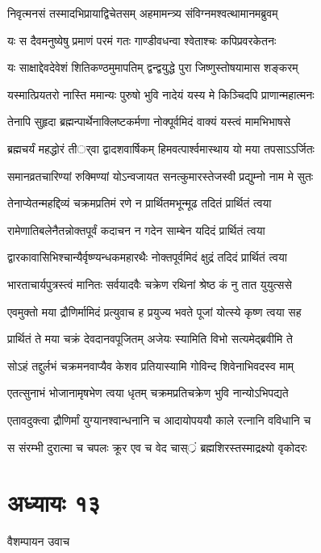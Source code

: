 \twolineshloka
{निवृत्मनसं तस्मादभिप्रायाद्विचेतसम्}
{अहमामन्त्र्य संविग्नमश्वत्थामानमब्रुवम्}


\twolineshloka
{यः स दैवमनुष्येषु प्रमाणं परमं गतः}
{गाण्डीवधन्वा श्वेताश्चः कपिप्रवरकेतनः}


\twolineshloka
{यः साक्षाद्देवदेवेशं शितिकण्ठमुमापतिम्}
{द्वन्द्वयुद्धे पुरा जिष्णुस्तोषयामास शङ्करम्}


\twolineshloka
{यस्मात्प्रियतरो नास्ति ममान्यः पुरुषो भुवि}
{नादेयं यस्य मे किञ्चिदपि प्राणान्महात्मनः}


\twolineshloka
{तेनापि सुहृदा ब्रह्मन्पार्थेनाक्लिष्टकर्मणा}
{नोक्पूर्वमिदं वाक्यं यस्त्वं मामभिभाषसे}


\twolineshloka
{ब्रह्मचर्यं महद्धोरं तीर््वा द्वादशवार्षिकम्}
{हिमवत्पार्श्वमास्थाय यो मया तपसाऽऽर्जितः}


\twolineshloka
{समानव्रतचारिण्यां रुक्मिण्यां योऽन्वजायत}
{सनत्कुमारस्तेजस्वी प्रद्युम्नो नाम मे सुतः}


\twolineshloka
{तेनाप्येतन्महद्दिव्यं चक्रमप्रतिमं रणे}
{न प्रार्थितमभून्मूढ तदितं प्रार्थितं त्वया}


\twolineshloka
{रामेणातिबलेनैतन्नोक्तपूर्वं कदाचन}
{न गदेन साम्बेन यदिदं प्रार्थितं त्वया}


\twolineshloka
{द्वारकावासिभिश्चान्यैर्वृष्ण्यन्धकमहारथैः}
{नोक्तपूर्वमिदं क्षुद्रं तदिदं प्रार्थितं त्वया}


\twolineshloka
{भारताचार्यपुत्रस्त्वं मानितः सर्वयादवैः}
{चक्रेण रथिनां श्रेष्ठ कं नु तात युयुत्ससे}


\twolineshloka
{एवमुक्तो मया द्रौणिर्मामिदं प्रत्युवाच ह}
{प्रयुज्य भवते पूजां योत्स्ये कृष्ण त्वया सह}


\twolineshloka
{प्रार्थितं ते मया चक्रं देवदानवपूजितम्}
{अजेयः स्यामिति विभो सत्यमेद्ब्रवीमि ते}


\twolineshloka
{सोऽहं तद्दुर्लभं चक्रमनवाप्यैव केशव}
{प्रतियास्यामि गोविन्द शिवेनाभिवदस्व माम्}


\twolineshloka
{एतत्सुनाभं भोजानामृषभेण त्वया धृतम्}
{चक्रमप्रतिचक्रेण भुवि नान्योऽभिपद्यते}


\twolineshloka
{एतावदुक्त्वा द्रौणिर्मां युग्यानश्वान्धनानि च}
{आदायोपययौ काले रत्नानि वविधानि च}


\twolineshloka
{स संरम्भी दुरात्मा च चपलः क्रूर एव च}
{वेद चास््रं ब्रह्मशिरस्तस्माद्रक्ष्यो वृकोदरः}


\chapter{अध्यायः १३}
\twolineshloka
{वैशम्पायन उवाच}
{}


